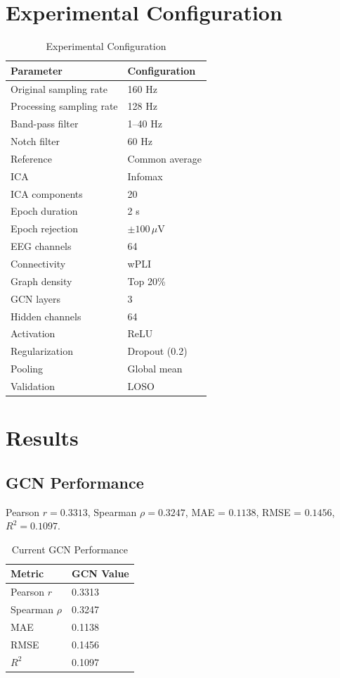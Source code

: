 \documentclass[conference]{IEEEtran}
\begin{document}
\section{Experimental Configuration}
\begin{table}[h]
\caption{Experimental Configuration}
\centering
\begin{tabular}{ll}
\toprule
Parameter & Configuration \\
\midrule
Original sampling rate & 160 Hz \\
Processing sampling rate & 128 Hz \\
Band-pass filter & 1--40 Hz \\
Notch filter & 60 Hz \\
Reference & Common average \\
ICA & Infomax \\
ICA components & 20 \\
Epoch duration & 2 s \\
Epoch rejection & $\pm 100\,\mu\text{V}$ \\
EEG channels & 64 \\
Connectivity & wPLI \\
Graph density & Top 20\% \\
GCN layers & 3 \\
Hidden channels & 64 \\
Activation & ReLU \\
Regularization & Dropout (0.2) \\
Pooling & Global mean \\
Validation & LOSO \\
\bottomrule
\end{tabular}
\end{table}

\section{Results}
\subsection{GCN Performance} Pearson $r = 0.3313$, Spearman $\rho = 0.3247$, MAE = $0.1138$, RMSE = $0.1456$, $R^2 = 0.1097$.

\begin{table}[h]
\caption{Current GCN Performance}
\centering
\begin{tabular}{ll}
\toprule
Metric & GCN Value \\
\midrule
Pearson $r$ & 0.3313 \\
Spearman $\rho$ & 0.3247 \\
MAE & 0.1138 \\
RMSE & 0.1456 \\
$R^2$ & 0.1097 \\
\bottomrule
\end{tabular}
\end{table}
\end{document}
